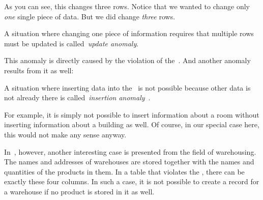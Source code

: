 As you can see, this changes three rows.
Notice that we wanted to change only \emph{one} single piece of data.
But we did change \emph{three} rows.%
%
\begin{definition}%
\label{def:updateAnomaly}%
A situation where changing one piece of information requires that multiple rows must be updated is called~\emph{update anomaly}.%
\end{definition}%
%
This anomaly is directly caused by the violation of the~.
And another anomaly results from it as well:%
%
\begin{definition}%
A situation where inserting data into the \db\ is not possible because other data is not already there is called~\emph{insertion anomaly}~\cite{S2024D:RNDAFDNF}.%
\end{definition}%
%
For example, it is simply not possible to insert information about a room without inserting information about a building as well.
Of course, in our special case here, this would not make any sense anyway.

In~\cite{K1983ASGTFNFIRDT}, however, another interesting case is presented from the field of warehousing.
The names and addresses of warehouses are stored together with the names and quantities of the products in them.
In a table that violates the , there can be exactly these four columns.
In such a case, it is not possible to create a record for a warehouse if no product is stored in it as well.%
%
\FloatBarrier%
\endhsection%
%
